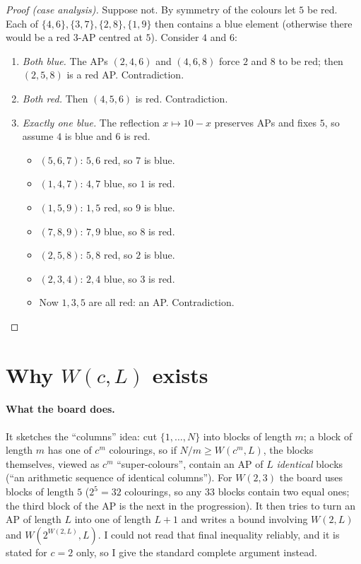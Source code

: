 \documentclass[11pt]{article}
\begin{document}
\begin{proof}[Proof (case analysis)]
Suppose not. By symmetry of the colours let $5$ be red. Each of $\{4,6\},\{3,7\},\{2,8\},\{1,9\}$ then contains a blue element (otherwise there would be a red $3$-AP centred at $5$). Consider $4$ and $6$:
\begin{enumerate}[nosep]
  \item \emph{Both blue.} The APs $(2,4,6)$ and $(4,6,8)$ force $2$ and $8$ to be red; then $(2,5,8)$ is a red AP. Contradiction.
  \item \emph{Both red.} Then $(4,5,6)$ is red. Contradiction.
  \item \emph{Exactly one blue.} The reflection $x\mapsto10-x$ preserves APs and fixes $5$, so assume $4$ is blue and $6$ is red.
  \begin{itemize}[nosep]
    \item $(5,6,7)$: $5,6$ red, so $7$ is blue.
    \item $(1,4,7)$: $4,7$ blue, so $1$ is red.
    \item $(1,5,9)$: $1,5$ red, so $9$ is blue.
    \item $(7,8,9)$: $7,9$ blue, so $8$ is red.
    \item $(2,5,8)$: $5,8$ red, so $2$ is blue.
    \item $(2,3,4)$: $2,4$ blue, so $3$ is red.
    \item Now $1,3,5$ are all red: an AP. Contradiction.
  \end{itemize}
\end{enumerate}
\end{proof}

\section{Why $W(c,L)$ exists}

\paragraph{What the board does.} It sketches the ``columns'' idea: cut $\{1,\dots,N\}$ into blocks of length $m$; a block of length $m$ has one of $c^m$ colourings, so if $N/m\ge W(c^m,L)$, the blocks themselves, viewed as $c^m$ ``super-colours'', contain an AP of $L$ \emph{identical} blocks (``an arithmetic sequence of identical columns''). For $W(2,3)$ the board uses blocks of length $5$ ($2^5=32$ colourings, so any $33$ blocks contain two equal ones; the third block of the AP is the next in the progression). It then tries to turn an AP of length $L$ into one of length $L+1$ and writes a bound involving $W(2,L)$ and $W(2^{W(2,L)},L)$. I could not read that final inequality reliably, and it is stated for $c=2$ only, so I give the standard complete argument instead.
\end{document}
